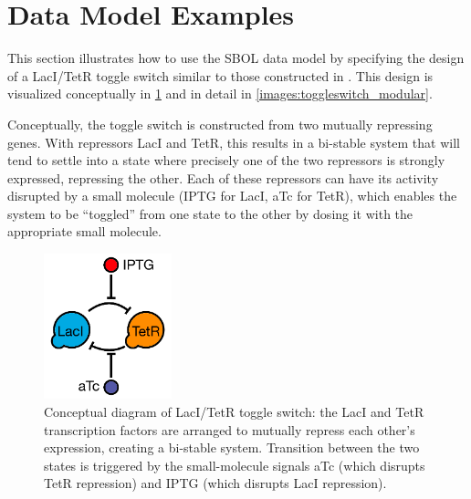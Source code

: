\section{Data Model Examples}
\label{sec:examples}


This section illustrates how to use the SBOL data model by specifying the design of a LacI/TetR toggle switch similar to those constructed in \cite{Gardner2000}. This design is visualized conceptually in \ref{images:toggle} and in detail in \ref{images:toggleswitch_modular}. 

Conceptually, the toggle switch is constructed from two mutually repressing genes.  
With repressors LacI and TetR, this results in a bi-stable system that will tend to settle into a state where precisely one of the two repressors is strongly expressed, repressing the other.
Each of these repressors can have its activity disrupted by a small molecule (IPTG for LacI, aTc for TetR), which enables the system to be ``toggled'' from one state to the other by dosing it with the appropriate small molecule.


\begin{figure}[ht]
\begin{center}
\includegraphics[width=0.33\textwidth]{images/toggle-highlevel2.pdf}
\caption[]{Conceptual diagram of LacI/TetR toggle switch: the LacI 
  and TetR transcription factors are arranged to mutually repress each other's expression, 
  creating a bi-stable system.  Transition between the two states
  is triggered by the small-molecule signals aTc (which disrupts TetR
  repression) and IPTG (which disrupts LacI repression).}
\label{images:toggle}
\end{center}
\end{figure}

